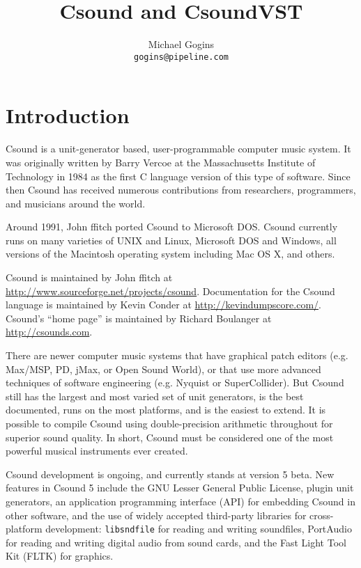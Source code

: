 \documentclass[10pt,letterpaper,onecolumn]{ltxguide}
\begin{document}
\lstset{language=c++,basicstyle=\ttfamily\scriptsize, tabsize=4, breaklines, fontadjust=true,fancyvrb=true,showstringspaces=false}

\title{Csound and CsoundVST}
\author{Michael Gogins \\ \texttt{gogins@pipeline.com}}
\maketitle


\section{Introduction}

Csound is a unit-generator based, user-programmable computer music system. It was originally written by Barry Vercoe at the Massachusetts Institute of Technology in 1984 as the first C language version of this type of software. Since then Csound has received numerous contributions from researchers, programmers, and musicians around the world. 

Around 1991, John ffitch ported Csound to Microsoft DOS. Csound currently runs on many varieties of UNIX and Linux, Microsoft DOS and Windows, all versions of the Macintosh operating system including Mac OS X, and others.

Csound is maintained by John ffitch at \url{http://www.sourceforge.net/projects/csound}. Documentation for the Csound language is maintained by Kevin Conder at \url{http://kevindumpscore.com/}. Csound's ``home page'' is maintained by Richard Boulanger at \url{http://csounds.com}. 

There are newer computer music systems that have graphical patch editors (e.g. Max/MSP, PD, jMax, or Open Sound World), or that use more advanced techniques of software engineering (e.g. Nyquist or SuperCollider). But Csound still has the largest and most varied set of unit generators, is the best documented, runs on the most platforms, and is the easiest to extend. It is possible to compile Csound using double-precision arithmetic throughout for superior sound quality. In short, Csound must be considered one of the most powerful musical instruments ever created.

Csound development is ongoing, and currently stands at version 5 beta. New features in Csound 5 include the GNU Lesser General Public License, plugin unit generators, an application programming interface (API) for embedding Csound in other software, and the use of widely accepted third-party libraries for cross-platform development: \texttt{libsndfile} for reading and writing soundfiles, PortAudio for reading and writing digital audio from sound cards, and the Fast Light Tool Kit (FLTK) for graphics.
\end{document}
